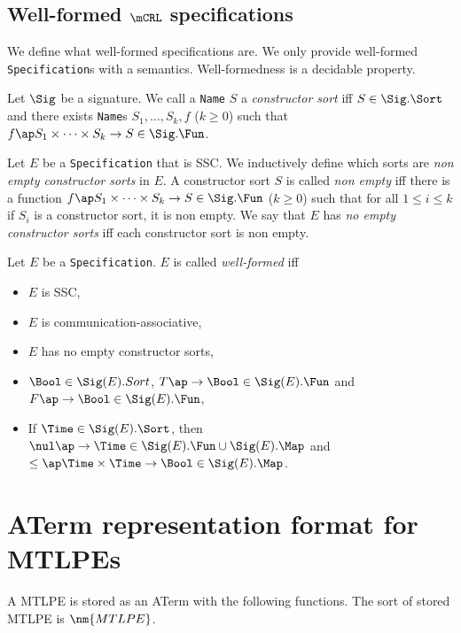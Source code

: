 \documentclass[twoside,fleqn,a4paper,dvips]{article}
\begin{document}
\subsection{Well-formed $\mCRL$ specifications}
We define what well-formed specifications are. We only provide
well-formed {\tt Specification}s with a semantics. Well-formedness
is a decidable property.
\begin{Dn}
Let $\Sig$ be a signature. We call a {\tt Name} $S$ a {\it constructor sort}
iff $S\in\Sig.\Sort$ and there exists {\tt Name}s $S_1,\ldots, S_k, f$ ($k\geq 0$)
such that $f\ap S_1\times \cdots\times S_k\rightarrow S\in \Sig.\Fun$.
\end{Dn}
\begin{Dn}
Let $E$ be a {\tt Specification} that is SSC. 
We inductively define which sorts are {\it non empty constructor sorts} in $E$.
A constructor sort $S$ is called {\it non empty} iff there is a function
$f\ap S_1\times\cdots\times S_k\rightarrow S\in \Sig.\Fun$ ($k\geq 0$) such
that for all $1\leq i\leq k$ if $S_i$ is a constructor sort, it is non empty.
We say
that $E$ has {\em no empty constructor sorts} iff each constructor sort is non
empty.
\end{Dn}
\begin{Dn}
Let $E$ be a {\tt Specification}. $E$ is called {\it well-formed} iff 
\begin{itemize}
\item
$E$ is SSC, 
\item
$E$ is communication-associative,
\item
$E$ has no empty constructor sorts,
\item
$\Bool\in \Sig(E).Sort$, $T\ap \rightarrow\Bool\in \Sig(E).\Fun$ and
$F\ap \rightarrow\Bool\in \Sig(E).\Fun$,
\item
If $\Time\in\Sig(E).\Sort$, then $\nul\ap \rightarrow\Time\in \Sig(E).\Fun\cup
\Sig(E).\Map$ and $\leq\ap \Time\times\Time\rightarrow\Bool\in
\Sig(E).\Map$. 
\end{itemize}
\end{Dn}

\newpage
\section{ATerm representation format for MTLPEs}
A MTLPE is stored as an ATerm with the following functions. The sort
of stored MTLPE is $\nm{MTLPE}$.
\end{document}
